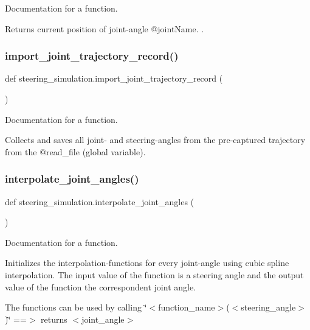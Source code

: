 Documentation for a function. 

Returns current position of joint-\/angle @joint\+Name. . \mbox{\label{namespacesteering__simulation_a628f6027d970db8d4071e5846de522fc}} 
\subsubsection{\texorpdfstring{import\_joint\_trajectory\_record()}{import\_joint\_trajectory\_record()}}
{\footnotesize\ttfamily def steering\+\_\+simulation.\+import\+\_\+joint\+\_\+trajectory\+\_\+record (\begin{DoxyParamCaption}{ }\end{DoxyParamCaption})}



Documentation for a function. 

Collects and saves all joint-\/ and steering-\/angles from the pre-\/captured trajectory from the @read\+\_\+file (global variable). \mbox{\label{namespacesteering__simulation_a6e3b1fe25edfbec1713a6bd3ef2a445e}} 
\subsubsection{\texorpdfstring{interpolate\_joint\_angles()}{interpolate\_joint\_angles()}}
{\footnotesize\ttfamily def steering\+\_\+simulation.\+interpolate\+\_\+joint\+\_\+angles (\begin{DoxyParamCaption}{ }\end{DoxyParamCaption})}



Documentation for a function. 

Initializes the interpolation-\/functions for every joint-\/angle using cubic spline interpolation. The input value of the function is a steering angle and the output value of the function the correspondent joint angle.

The functions can be used by calling \char`\"{}$<$function\+\_\+name$>$($<$steering\+\_\+angle$>$)\char`\"{} ==$>$ returns $<$joint\+\_\+angle$>$ \mbox{\label{namespacesteering__simulation_a49d8e64bcd7d1221d6de01b9b22bb799}} 
